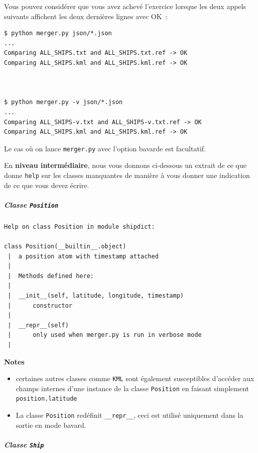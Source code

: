     Vous pouvez considérer que vous avez achevé l'exercice lorsque les deux
appels suivants affichent les deux dernières lignes avec OK~:

\begin{verbatim}
$ python merger.py json/*.json
...
Comparing ALL_SHIPS.txt and ALL_SHIPS.txt.ref -> OK
Comparing ALL_SHIPS.kml and ALL_SHIPS.kml.ref -> OK



$ python merger.py -v json/*.json
...
Comparing ALL_SHIPS-v.txt and ALL_SHIPS-v.txt.ref -> OK
Comparing ALL_SHIPS.kml and ALL_SHIPS.kml.ref -> OK
\end{verbatim}

    Le cas où on lance \texttt{merger.py} avec l'option bavarde est
facultatif.



    En \textbf{niveau intermédiaire}, nous vous donnons ci-dessous un
extrait de ce que donne \texttt{help} sur les classes manquantes de
manière à vous donner une indication de ce que vous devez écrire.

    \hypertarget{classe-position}{%
\subparagraph{\texorpdfstring{Classe
\texttt{Position}}{Classe Position}}\label{classe-position}}

    \begin{verbatim}
Help on class Position in module shipdict:

class Position(__builtin__.object)
 |  a position atom with timestamp attached
 |  
 |  Methods defined here:
 |  
 |  __init__(self, latitude, longitude, timestamp)
 |      constructor
 |  
 |  __repr__(self)
 |      only used when merger.py is run in verbose mode
 |  
\end{verbatim}

    \textbf{Notes}

\begin{itemize}
\tightlist
\item
  certaines autres classes comme \texttt{KML} sont également
  susceptibles d'accéder aux champs internes d'une instance de la classe
  \texttt{Position} en faisant simplement \texttt{position.latitude}
\item
  La classe \texttt{Position} redéfinit \texttt{\_\_repr\_\_}, ceci est
  utilisé uniquement dans la sortie en mode bavard.
\end{itemize}

    \hypertarget{classe-ship}{%
\subparagraph{\texorpdfstring{Classe
\texttt{Ship}}{Classe Ship}}\label{classe-ship}}


